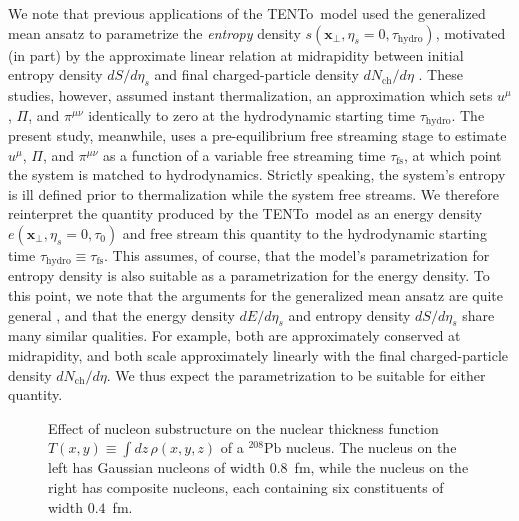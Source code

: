 \documentclass[aps,prc,reprint,amsmath,nofootinbib]{revtex4-1}
\newcommand{\trento}{T\raisebox{-0.5ex}{R}ENTo}
\newcommand{\nch}{N_\text{ch}}
\newcommand{\taufs}{\tau_\text{fs}}
\newcommand{\xv}{\mathbf x}
\begin{document}
We note that previous applications of the \trento\ model \cite{Moreland:2014oya, Bernhard:2016tnd} used the generalized mean ansatz to parametrize the \emph{entropy} density $s(\xv_\perp, \eta_s=0, \tau_\text{hydro})$, motivated (in part) by the approximate linear relation at midrapidity between initial entropy density $dS/d\eta_s$ and final charged-particle density $d\nch/d\eta$ \cite{Shen:2015qta}.
These studies, however, assumed instant thermalization, an approximation which sets $u^\mu$, $\Pi$, and $\pi^{\mu\nu}$ identically to zero at the hydrodynamic starting time $\tau_\text{hydro}$.
The present study, meanwhile, uses a pre-equilibrium free streaming stage to estimate $u^\mu$, $\Pi$, and $\pi^{\mu\nu}$ as a function of a variable free streaming time $\taufs$, at which point the system is matched to hydrodynamics.
Strictly speaking, the system's entropy is ill defined prior to thermalization while the system free streams.
We therefore reinterpret the quantity produced by the \trento\ model as an energy density $e(\xv_\perp, \eta_s=0, \tau_0)$ and free stream this quantity to the hydrodynamic starting time $\tau_\text{hydro} \equiv \taufs$.
This assumes, of course, that the model's parametrization for entropy density is also suitable as a parametrization for the energy density.
To this point, we note that the arguments for the generalized mean ansatz are quite general \cite{Moreland:2014oya}, and that the energy density $dE/d\eta_s$ and entropy density $dS/d\eta_s$ share many similar qualities.
For example, both are approximately conserved at midrapidity, and both scale approximately linearly with the final charged-particle density $d\nch/d\eta$.
We thus expect the parametrization to be suitable for either quantity.

\begin{figure}
  \caption{\label{fig:thickness} Effect of nucleon substructure on the nuclear thickness function $T(x, y) \equiv \int dz\, \rho(x, y, z)$ of a $^{208}\mathrm{Pb}$ nucleus. The nucleus on the left has Gaussian nucleons of width $0.8$~fm, while the nucleus on the right has composite nucleons, each containing six constituents of width $0.4$~fm.}
\end{figure}
\end{document}
